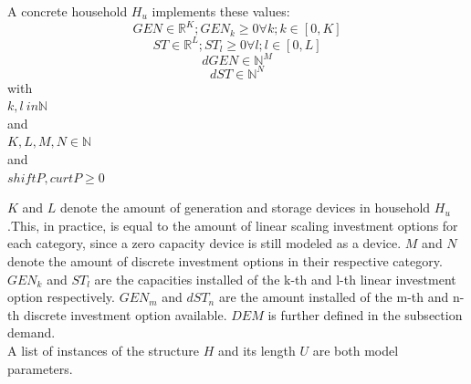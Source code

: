 \documentclass[
	11pt,								%
	DIV10,								%
	a4paper,         					%
	oneside,							%
	headheight=20pt,					%
	footheight=20pt,					%
    parskip=full,						%
    listof=totoc,						%
	bibliography=totoc,					%
	index=totoc,						%
]{scrartcl}
\begin{document}
A concrete household $H_u$ implements these values:
\begin{equation}
	GEN \in \mathbb{R}^{K}; GEN_k \geq 0 \forall k; k\in [0,K]
\end{equation}
\begin{equation}
	ST \in \mathbb{R}^{L}; ST_l \geq 0 \forall l; l\in [0,L] 
\end{equation}
\begin{equation}
	dGEN \in \mathbb{N}^{M}
\end{equation}
\begin{equation}
	dST \in \mathbb{N}^{N}
\end{equation}
with\\
$k,l\ in \mathbb{N}$\\
and\\
$K,L,M,N \in \mathbb{N}$\\
and\\
$shiftP, curtP \geq 0$

$K$ and $L$ denote the amount of generation and storage devices in household $H_u$.This, in practice, is equal to the amount of linear scaling investment options for each category, since a zero capacity device is still modeled as a device. $M$ and $N$ denote the amount of discrete investment options in their respective category. $GEN_k$ and $ST_l$ are the capacities installed of the k-th and l-th linear investment option respectively. $GEN_m$ and $dST_n$ are the amount installed of the m-th and n-th discrete investment option available. $DEM$ is further defined in the subsection demand.
\\
A list of instances of the structure $H$ and its length $U$ are both model parameters.
\end{document}
